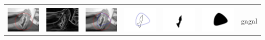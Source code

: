 \begin{table}[H]
\begin{tabular}{|m{0.7in}|m{0.7in}|m{0.7in}|m{0.7in}|m{0.7in}|m{0.7in}|m{0.7in}|}
		&  &  & & & &  \\
		\includegraphics[width=0.7in]{dataset/dataset_3/luka_merah/ready/8_interp_init.jpg}&
		\includegraphics[width=0.7in]{dataset/dataset_3/luka_merah/ready/8_interp_ext.jpg}&
		\includegraphics[width=0.7in]{dataset/dataset_3/luka_merah/ready/8_interp_result.jpg}&
		\includegraphics[width=0.7in]{dataset/dataset_3/luka_merah/ready/8_gt_r.jpg}&
		\includegraphics[width=0.7in]{dataset/dataset_3/luka_merah/ready/8_r.jpg}&
		\includegraphics[width=0.7in]{dataset/dataset_3/luka_merah/ready/8_interp_r.jpg}&
		gagal\\
		\hline
		

\end{tabular}
\end{table}
